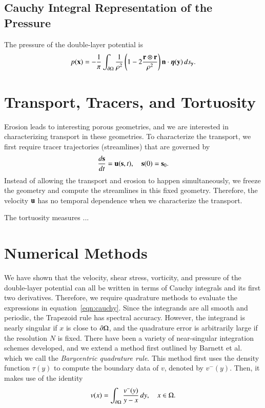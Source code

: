 \documentclass[preprint, 10pt]{elsarticle}
\begin{document}
\subsection{Cauchy Integral Representation of the Pressure}
The pressure of the double-layer potential is
\begin{align}
  p({\mathbf{x}}) = -\frac{1}{\pi} \int_{{\partial}\Omega} \frac{1}{\rho^2}
    \left(1 - 2 \frac{{\mathbf{r}} \otimes {\mathbf{r}}}{\rho^2} \right) {\mathbf{n}}
    \cdot {\boldsymbol\eta}({\mathbf{y}}) \, ds_{\mathbf{y}}.
\end{align}




\section{Transport, Tracers, and Tortuosity}
Erosion leads to interesting porous geometries, and we are interested in
characterizing transport in these geometries.  To characterize the
transport, we first require tracer trajectories (streamlines) that are
governed by
\begin{align}
  \frac{d{\mathbf{s}}}{dt} = {\mathbf{u}}({\mathbf{s}},t), \quad {\mathbf{s}}(0) = {\mathbf{s}}_0.
\end{align}
Instead of allowing the transport and erosion to happen simultaneously,
we freeze the geometry and compute the streamlines in this fixed
geometry.  Therefore, the velocity ${\mathbf{u}}$ has no temporal dependence when
we characterize the transport.

The tortuosity measures ...


\section{Numerical Methods}
\label{s:method}
We have shown that the velocity, shear stress, vorticity, and pressure
of the double-layer potential can all be written in terms of Cauchy
integrals and its first two derivatives.  Therefore, we require
quadrature methods to evaluate the expressions in
equation~\eqref{eqn:cauchy}.  Since the integrands are all smooth and
periodic, the Trapezoid rule has spectral accuracy.  However, the
integrand is nearly singular if $x$ is close to ${\partial}\Omega$, and the
quadrature error is arbitrarily large if the resolution $N$ is fixed.
There have been a variety of near-singular integration schemes
developed, and we extend a method first outlined by Barnett et
al.~\cite{bar-wu-vee2015} which we call the {\em Barycentric quadrature
rule}.  This method first uses the density function $\tau(y)$ to compute
the boundary data of $v$, denoted by $v^-(y)$.  Then, it makes use
of the identity
\begin{align}
  v(x) = \int_{{\partial}\Omega} \frac{v^{-}(y)}{y-x} \, dy, 
  \quad x \in \Omega.
\end{align}
\end{document}
